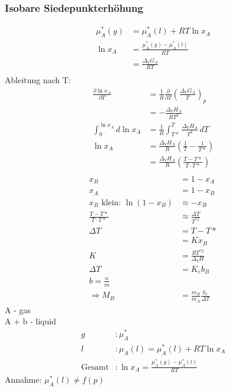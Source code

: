 \documentclass[a4paper, fleqn]{article}
\begin{document}
\subsubsection{Isobare Siedepunkterhöhung}
\begin{align*}
    \mu_A^*(g) &= \mu_A^*(l)+RT\ln x_A\\
    \ln x_A &= \frac{\mu_A^*(g) - \mu_A^*(l)}{RT}\\
    &= \frac{\Delta_V G_A}{RT}\\
\end{align*}
Ableitung nach T:
\begin{align*}
    \frac{\partial \ln x_A}{\partial T} &= \frac{1}{R} \frac{\partial}{\partial T} \left(\frac{\Delta_V G_A}{T}\right)_p\\
    &= - \frac{\Delta_V H_A}{RT^2}\\
    \int_{0}^{\ln x_A} d\ln x_A &= \frac{1}{R} \int_{T*}^{T} \frac{\Delta_V H_A}{T^2}\,dT\\
    \ln x_A &= \frac{\Delta_V H_A}{R}\left(\frac{1}{T}-\frac{1}{T*}\right)\\
    &= \frac{\Delta_V H_A}{R} \left(\frac{T-T*}{T\cdot T*}\right)\\
\end{align*}
\begin{align*}
    x_B &= 1-x_A\\
    x_A &= 1-x_B\\
    x_B \text{ klein: } \ln (1-x_B) &\approx - x_B\\
    \frac{T-T*}{T\cdot T*} &\approx \frac{\Delta T}{T^{*2}}\\
    \Delta T &= T-T*\\
    &= K x_B\\
    K &= \frac{RT^{*2}}{\Delta_V H}\\
    \Delta T &= K_e b_B\\
    b = \frac{n}{m}\\
    \Rightarrow M_B &= \frac{m_B}{m_A}\frac{k_e}{\Delta T}
\end{align*}
A - gas\\
A + b - liquid\\
\begin{align*}
    g&: \mu_A^*\\
    l&: \mu_A (l) = \mu_A^*(l)+RT\ln x_A\\
    \mathrm{Gesamt}&: \ln x_A = \frac{\mu_A^*(g)-\mu_A^*(l)}{RT}
\end{align*}
Annahme: $\mu_A^* (l) \neq f(p)$
\end{document}
